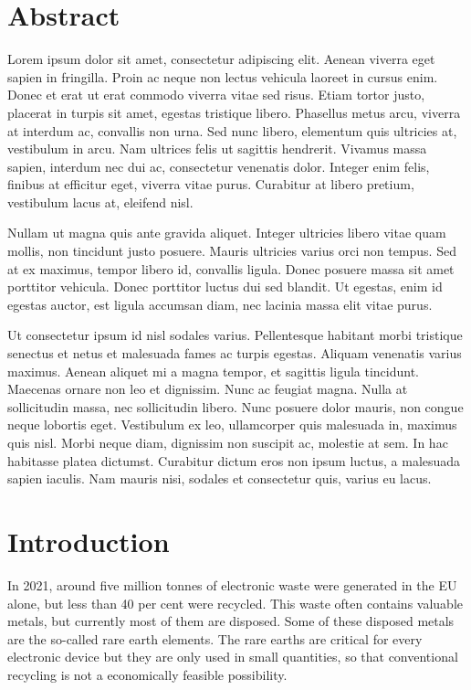 \chapter*{Abstract}

Lorem ipsum dolor sit amet, consectetur adipiscing elit. Aenean viverra eget sapien in fringilla. Proin ac neque non lectus vehicula laoreet in cursus enim. Donec et erat ut erat commodo viverra vitae sed risus. Etiam tortor justo, placerat in turpis sit amet, egestas tristique libero. Phasellus metus arcu, viverra at interdum ac, convallis non urna. Sed nunc libero, elementum quis ultricies at, vestibulum in arcu. Nam ultrices felis ut sagittis hendrerit. Vivamus massa sapien, interdum nec dui ac, consectetur venenatis dolor. Integer enim felis, finibus at efficitur eget, viverra vitae purus. Curabitur at libero pretium, vestibulum lacus at, eleifend nisl.

Nullam ut magna quis ante gravida aliquet. Integer ultricies libero vitae quam mollis, non tincidunt justo posuere. Mauris ultricies varius orci non tempus. Sed at ex maximus, tempor libero id, convallis ligula. Donec posuere massa sit amet porttitor vehicula. Donec porttitor luctus dui sed blandit. Ut egestas, enim id egestas auctor, est ligula accumsan diam, nec lacinia massa elit vitae purus.

Ut consectetur ipsum id nisl sodales varius. Pellentesque habitant morbi tristique senectus et netus et malesuada fames ac turpis egestas. Aliquam venenatis varius maximus. Aenean aliquet mi a magna tempor, et sagittis ligula tincidunt. Maecenas ornare non leo et dignissim. Nunc ac feugiat magna. Nulla at sollicitudin massa, nec sollicitudin libero. Nunc posuere dolor mauris, non congue neque lobortis eget. Vestibulum ex leo, ullamcorper quis malesuada in, maximus quis nisl. Morbi neque diam, dignissim non suscipit ac, molestie at sem. In hac habitasse platea dictumst. Curabitur dictum eros non ipsum luctus, a malesuada sapien iaculis. Nam mauris nisi, sodales et consectetur quis, varius eu lacus.

\chapter*{Introduction}

In 2021, around five million tonnes of electronic waste were generated in the EU alone, but less than 40 per cent were recycled.
This waste often contains valuable metals, but currently most of them are disposed.
Some of these disposed metals are the so-called rare earth elements.
The rare earths are critical for every electronic device but they are only used in small quantities, so that conventional recycling is not a economically feasible possibility.

